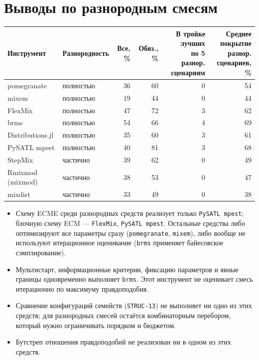 \documentclass[10pt,a4paper]{article}
\begin{document}
\section{Выводы по разнородным смесям}
{\small
\begin{center}
\begin{tabular}{@{}l l r r r r@{}}
\toprule
Инструмент & Разнородность & Все, \% & Обяз., \% & \shortstack[r]{\scriptsize В тройке лучших\\\scriptsize по 5 разнор. сценариям} & \shortstack[r]{\scriptsize Среднее покрытие\\\scriptsize разнор. сценариев, \%} \\
\midrule
pomegranate & полностью & \cellcolor{hm!30}36 & \cellcolor{hm!47}60 & 0 & \cellcolor{hm!43}54 \\
mixem & полностью & \cellcolor{hm!18}19 & \cellcolor{hm!36}44 & 0 & \cellcolor{hm!36}44 \\
FlexMix & полностью & \cellcolor{hm!38}47 & \cellcolor{hm!55}72 & 3 & \cellcolor{hm!48}62 \\
brms & полностью & \cellcolor{hm!43}54 & \cellcolor{hm!51}66 & 4 & \cellcolor{hm!53}69 \\
Distributions.jl & полностью & \cellcolor{hm!29}35 & \cellcolor{hm!47}60 & 3 & \cellcolor{hm!48}61 \\
PySATL mpest & полностью & \cellcolor{hm!33}40 & \cellcolor{hm!62}81 & 3 & \cellcolor{hm!53}68 \\
StepMix & частично & \cellcolor{hm!32}39 & \cellcolor{hm!48}62 & 0 & \cellcolor{hm!40}49 \\
Rmixmod (mixmod) & частично & \cellcolor{hm!32}38 & \cellcolor{hm!42}53 & 0 & \cellcolor{hm!38}47 \\
mixdist & частично & \cellcolor{hm!28}33 & \cellcolor{hm!39}49 & 0 & \cellcolor{hm!31}38 \\
\bottomrule
\end{tabular}
\end{center}}
\begin{itemize}
\item Схему ECME среди разнородных средств реализует только \texttt{PySATL mpest}; блочную схему ECM --- \texttt{FlexMix}, \texttt{PySATL mpest}.
Остальные средства либо оптимизируют все параметры сразу (\texttt{pomegranate}, \texttt{mixem}), либо вообще не используют итерационное оценивание
(\texttt{brms} применяет байесовское сэмплирование).
\item Мультистарт, информационные критерии, фиксацию параметров и явные границы одновременно выполняет \texttt{brms}.
Этот инструмент не оценивает смесь итерационно по максимуму правдоподобия.
\item Сравнение конфигураций семейств (\texttt{STRUC-13}) не выполняет ни одно из этих средств; для разнородных смесей остаётся
комбинаторным перебором, который нужно ограничивать порядком и бюджетом.
\item Бутстреп отношения правдоподобий не реализован ни в одном из этих средств.
\end{itemize}
\end{document}
